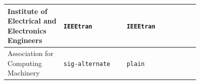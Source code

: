 \documentclass[twocolumn]{article}
\begin{document}
\label{tab:MyFirstTable1}
\begin{xtabular}{
		p{0.20\linewidth}
		p{0.26\linewidth}
		p{0.19\linewidth}
		m{0.11\linewidth}
	}
	Institute of Electrical and Electronics Engineers &\Verb|IEEEtran| & \Verb|IEEEtran|& \\ 
	\midrule
	Association for Computing Machinery & \Verb|sig-alternate|  & \Verb|plain| &    \\ 

\end{xtabular}
\end{document}
